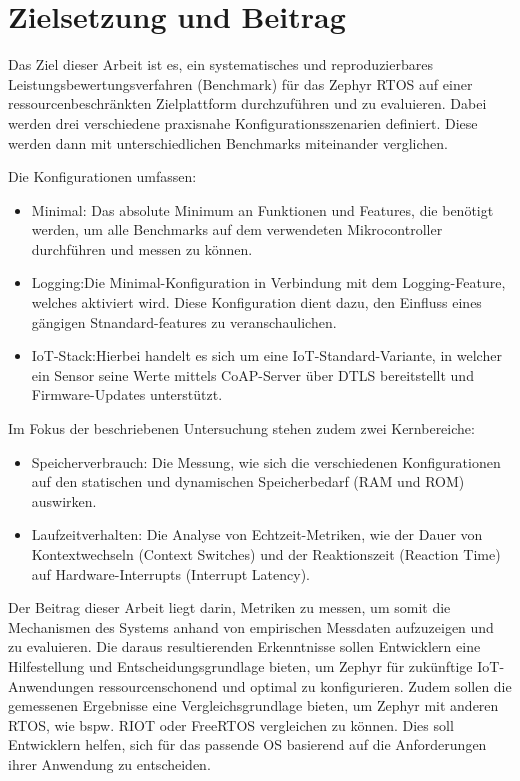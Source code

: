 \section{Zielsetzung und Beitrag}

Das Ziel dieser Arbeit ist es, ein systematisches und reproduzierbares Leistungsbewertungsverfahren (Benchmark) für das Zephyr RTOS auf einer ressourcenbeschränkten Zielplattform durchzuführen und zu evaluieren. Dabei werden drei verschiedene praxisnahe Konfigurationsszenarien definiert. Diese werden dann mit unterschiedlichen Benchmarks miteinander verglichen.

Die Konfigurationen umfassen:

\begin{itemize}
\item Minimal: Das absolute Minimum an Funktionen und Features, die benötigt werden, um alle Benchmarks auf dem verwendeten Mikrocontroller durchführen und messen zu können.
\item Logging:Die Minimal-Konfiguration in Verbindung mit dem Logging-Feature, welches aktiviert wird. Diese Konfiguration dient dazu, den Einfluss eines gängigen Stnandard-features zu veranschaulichen.
\item IoT-Stack:Hierbei handelt es sich um eine IoT-Standard-Variante, in welcher ein Sensor seine Werte mittels CoAP-Server über DTLS bereitstellt und Firmware-Updates unterstützt.
\end{itemize}

Im Fokus der beschriebenen Untersuchung stehen zudem zwei Kernbereiche:

\begin{itemize}
\item Speicherverbrauch: Die Messung, wie sich die verschiedenen Konfigurationen auf den statischen und dynamischen Speicherbedarf (RAM und ROM) auswirken.
\item Laufzeitverhalten: Die Analyse von Echtzeit-Metriken, wie der Dauer von Kontextwechseln (Context Switches) und der Reaktionszeit (Reaction Time) auf Hardware-Interrupts (Interrupt Latency).
\end{itemize}

Der Beitrag dieser Arbeit liegt darin, Metriken zu messen, um somit die Mechanismen des Systems anhand von empirischen Messdaten aufzuzeigen und zu evaluieren. Die daraus resultierenden Erkenntnisse sollen Entwicklern eine Hilfestellung und Entscheidungsgrundlage bieten, um Zephyr für zukünftige IoT-Anwendungen ressourcenschonend und optimal zu konfigurieren. Zudem sollen die gemessenen Ergebnisse eine Vergleichsgrundlage bieten, um Zephyr mit anderen RTOS, wie bspw. RIOT oder FreeRTOS vergleichen zu können. Dies soll Entwicklern helfen, sich für das passende OS basierend auf die Anforderungen ihrer Anwendung zu entscheiden.

